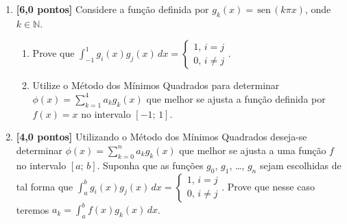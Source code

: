 \documentclass[10pt,a4paper]{article}
\newcommand{\sen}{\,\textrm{sen}\,}
\begin{document}
\begin{enumerate}
 \item \textbf{[6,0 pontos]} Considere a função definida por $g_k(x)=\sen(k\pi x)$, onde $k\in\mathbb{N}$.

   \begin{enumerate}
    \item Prove que $\displaystyle\int_{-1}^1 g_i(x)g_j(x)\,dx = \begin{cases}1,\,i = j \\ 0,\,i\neq j\end{cases}$.
    \item Utilize o Método dos Mínimos Quadrados para determinar $\displaystyle \phi(x) = \sum_{k=1}^4 a_kg_k(x)$ que melhor se ajusta a função definida por 
          $f(x) = x$ no intervalo $[-1;\, 1]$.
   \end{enumerate}

 \item \textbf{[4,0 pontos]} Utilizando o Método dos Mínimos Quadrados deseja-se determinar $\displaystyle \phi(x) = \sum_{k=0}^n a_kg_k(x)$ que melhor se ajusta 
a uma função $f$ no intervalo $[a;\, b]$. Suponha que as funções $g_0$, $g_1$, \ldots, $g_n$ sejam escolhidas de tal forma que 
$\displaystyle\int_a^b g_i(x)g_j(x)\,dx = \begin{cases}1,\,i = j \\ 0,\,i\neq j\end{cases}$. Prove que nesse caso teremos 
$a_k = \displaystyle\int_a^b f(x)g_k(x)\,dx$.

\end{enumerate}
\end{document}
